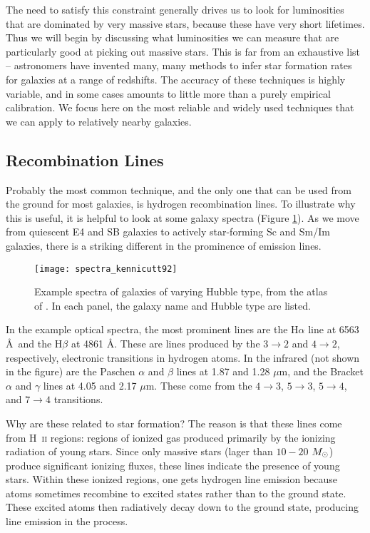 The need to satisfy this constraint generally drives us to look for luminosities that are dominated by very massive stars, because these have very short lifetimes. Thus we will begin by discussing what luminosities we can measure that are particularly good at picking out massive stars. This is far from an exhaustive list -- astronomers have invented many, many methods to infer star formation rates for galaxies at a range of redshifts. The accuracy of these techniques is highly variable, and in some cases amounts to little more than a purely empirical calibration. We focus here on the most reliable and widely used techniques that we can apply to relatively nearby galaxies.

\subsection{Recombination Lines}

Probably the most common technique, and the only one that can be used from the ground for most galaxies, is hydrogen recombination lines. To illustrate why this is useful, it is helpful to look at some galaxy spectra (Figure \ref{fig:spectra_kennicutt92}). As we move from quiescent E4 and SB galaxies to actively star-forming Sc and Sm/Im galaxies, there is a striking different in the prominence of emission lines.

\begin{figure}
\texttt{[image: spectra\_kennicutt92]}
\caption[Optical spectra of galaxies across the Hubble sequence]{
\label{fig:spectra_kennicutt92}
Example spectra of galaxies of varying Hubble type, from the atlas of \citet{kennicutt92a}. In each panel, the galaxy name and Hubble type are listed.
}
\end{figure}

In the example optical spectra, the most prominent lines are the H$\alpha$ line at 6563 \AA\ and the H$\beta$ at 4861 \AA. These are lines produced by the $3\rightarrow 2$ and $4\rightarrow 2$, respectively, electronic transitions in hydrogen atoms. In the infrared (not shown in the figure) are the Paschen $\alpha$ and $\beta$ lines at 1.87 and 1.28 $\mu$m, and the Bracket $\alpha$ and $\gamma$ lines at 4.05 and 2.17 $\mu$m. These come from the $4\rightarrow 3$, $5\rightarrow 3$, $5\rightarrow 4$, and $7\rightarrow 4$ transitions.

Why are these related to star formation? The reason is that these lines come from H~\textsc{ii} regions: regions of ionized gas produced primarily by the ionizing radiation of young stars. Since only massive stars (lager than $10-20$ $M_{\odot}$) produce significant ionizing fluxes, these lines indicate the presence of young stars. Within these ionized regions, one gets hydrogen line emission because atoms sometimes recombine to excited states rather than to the ground state. These excited atoms then radiatively decay down to the ground state, producing line emission in the process.

